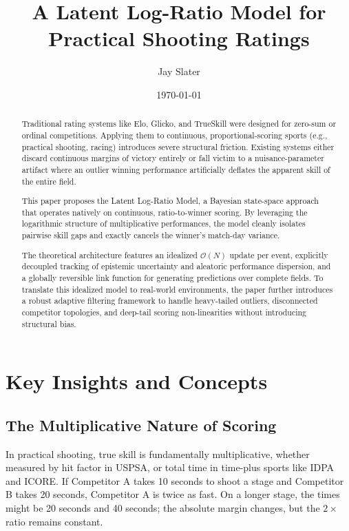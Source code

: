 \documentclass[12pt]{article}
\title{A Latent Log-Ratio Model for Practical Shooting Ratings}
\author{Jay Slater}
\date{\today}
\begin{document}
	\maketitle

	\begin{abstract}
		Traditional rating systems like Elo, Glicko, and TrueSkill were designed for zero-sum or ordinal competitions. Applying them to continuous, proportional-scoring sports (e.g., practical shooting, racing) introduces severe structural friction. Existing systems either discard continuous margins of victory entirely or fall victim to a nuisance-parameter artifact where an outlier winning performance artificially deflates the apparent skill of the entire field.
		
		This paper proposes the Latent Log-Ratio Model, a Bayesian state-space approach that operates natively on continuous, ratio-to-winner scoring. By leveraging the logarithmic structure of multiplicative performances, the model cleanly isolates pairwise skill gaps and exactly cancels the winner's match-day variance.
		
		The theoretical architecture features an idealized $\mathcal{O}(N)$	update per event, explicitly decoupled tracking of epistemic uncertainty and aleatoric performance dispersion, and a globally reversible link function for generating predictions over complete fields. To translate this idealized model to real-world environments, the paper further introduces a robust adaptive filtering framework to handle heavy-tailed outliers, disconnected competitor topologies, and deep-tail scoring non-linearities without introducing structural bias.
	\end{abstract}

	\section{Key Insights and Concepts}
	\label{sec:insights}

	\subsection{The Multiplicative Nature of Scoring}
	In practical shooting, true skill is fundamentally multiplicative, whether measured by hit factor  in USPSA, or total time in time-plus sports like IDPA and ICORE. If Competitor A takes 10 seconds to shoot a stage and Competitor B takes 20 seconds, Competitor A is twice as fast. On a longer stage, the times might be 20 seconds and 40 seconds; the absolute margin changes, but the $2\times$ ratio remains constant.
\end{document}
